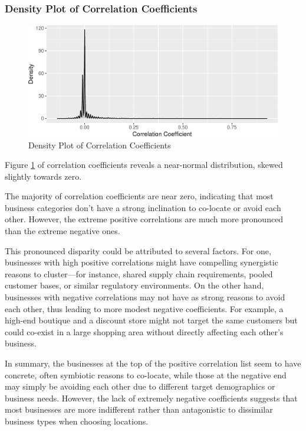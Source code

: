 \documentclass[
]{article}
\begin{document}
\hypertarget{density-plot-of-correlation-coefficients}{%
\subsubsection{Density Plot of Correlation Coefficients}\label{density-plot-of-correlation-coefficients}}

\begin{figure}
\centering
\includegraphics{paper_files/figure-latex/density-1.pdf}
\caption{\label{fig:density}Density Plot of Correlation Coefficients}
\end{figure}

Figure \ref{fig:density} of correlation coefficients reveals a near-normal distribution, skewed slightly towards zero.

The majority of correlation coefficients are near zero, indicating that most business categories don't have a strong inclination to co-locate or avoid each other. However, the extreme positive correlations are much more pronounced than the extreme negative ones.

This pronounced disparity could be attributed to several factors. For one, businesses with high positive correlations might have compelling synergistic reasons to cluster---for instance, shared supply chain requirements, pooled customer bases, or similar regulatory environments. On the other hand, businesses with negative correlations may not have as strong reasons to avoid each other, thus leading to more modest negative coefficients. For example, a high-end boutique and a discount store might not target the same customers but could co-exist in a large shopping area without directly affecting each other's business.

In summary, the businesses at the top of the positive correlation list seem to have concrete, often symbiotic reasons to co-locate, while those at the negative end may simply be avoiding each other due to different target demographics or business needs. However, the lack of extremely negative coefficients suggests that most businesses are more indifferent rather than antagonistic to dissimilar business types when choosing locations.
\end{document}
